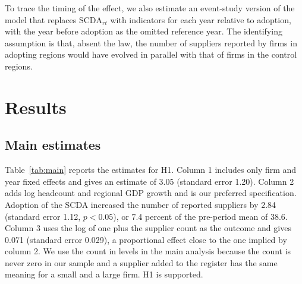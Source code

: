 \documentclass[11pt]{article}
\begin{document}
To trace the timing of the effect, we also estimate an event-study version of the model that replaces $\text{SCDA}_{rt}$ with indicators for each year relative to adoption, with the year before adoption as the omitted reference year. The identifying assumption is that, absent the law, the number of suppliers reported by firms in adopting regions would have evolved in parallel with that of firms in the control regions.

\section{Results}

\subsection{Main estimates}

Table~\ref{tab:main} reports the estimates for H1. Column 1 includes only firm and year fixed effects and gives an estimate of 3.05 (standard error 1.20). Column 2 adds log headcount and regional GDP growth and is our preferred specification. Adoption of the SCDA increased the number of reported suppliers by 2.84 (standard error 1.12, $p < 0.05$), or 7.4 percent of the pre-period mean of 38.6. Column 3 uses the log of one plus the supplier count as the outcome and gives 0.071 (standard error 0.029), a proportional effect close to the one implied by column 2. We use the count in levels in the main analysis because the count is never zero in our sample and a supplier added to the register has the same meaning for a small and a large firm. H1 is supported.
\end{document}
